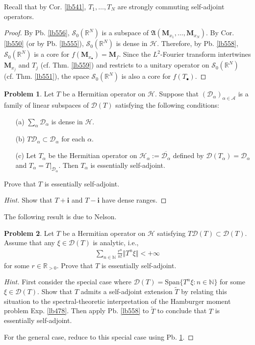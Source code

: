 \documentclass[12pt,b5paper,notitlepage]{article}
\theoremstyle{definition}
\newtheorem{prob}{\color{red}Problem}[section]
\theoremstyle{plain}
\newcommand{\fk}{\mathfrak}
\newcommand{\wtd}{\widetilde}
\newcommand{\ovl}{\overline}
\newcommand{\Dom}{\mathscr{D}}
\newcommand{\Span}{\mathrm{Span}}
\newcommand{\im}{\mathbf{i}}
\newcommand{\blt}{\bullet}
\newcommand{\Nbb}{\mathbb N}
\newcommand{\Rbb}{\mathbb R}
\newcommand{\MH}{\mathcal H}
\newcommand{\MS}{\mathcal S}
\newcommand{\SA}{\mathscr A}
\newcommand{\Mbf}{\mathbf M}
\numberwithin{equation}{section}
\begin{document}
Recall that by Cor. \ref{lb541}, $T_1,\dots,T_N$ are strongly commuting self-adjoint operators.

\begin{proof}
By Pb. \ref{lb556}, $\MS_0(\Rbb^N)$ is a subspace of $\fk A(\Mbf_{x_1},\dots,\Mbf_{x_N})$. By Cor. \ref{lb550} (or by Pb. \ref{lb555}), $\MS_0(\Rbb^N)$ is dense in $\MH$. Therefore, by Pb. \ref{lb558}, $\MS_0(\Rbb^N)$ is a core for $f(\Mbf_{x_\blt})=\Mbf_f$. Since the $L^2$-Fourier transform intertwines $\Mbf_{x_j}$ and $T_j$ (cf. Thm. \ref{lb559}) and restricts to a unitary operator on $\MS_0(\Rbb^N)$ (cf. Thm. \ref{lb551}), the space $\MS_0(\Rbb^N)$ is also a core for $f(T_\blt)$.
\end{proof}


\begin{prob}\label{lb552}
Let $T$ be a Hermitian operator on $\MH$. Suppose that $(\Dom_\alpha)_{\alpha\in\SA}$ is a family of linear subspaces of $\Dom(T)$ satisfying the following conditions:
\begin{enumerate}
\item[(a)] $\sum_\alpha\Dom_\alpha$ is dense in $\MH$.
\item[(b)] $T\Dom_\alpha\subset\Dom_{\alpha}$ for each $\alpha$.
\item[(c)] Let $T_\alpha$ be the Hermitian operator on $\MH_\alpha:=\ovl{\Dom_\alpha}$ defined by $\Dom(T_\alpha)=\Dom_\alpha$ and $T_\alpha=T|_{\Dom_\alpha}$. Then $T_\alpha$ is essentially self-adjoint. 
\end{enumerate}
Prove that $T$ is essentially self-adjoint.
\end{prob}

\begin{proof}[Hint]
Show that $T+\im$ and $T-\im$ have dense ranges.
\end{proof}

The following result is due to Nelson.

\begin{prob}
Let $T$ be a Hermitian operator on $\MH$ satisfying $T\Dom(T)\subset\Dom(T)$. Assume that any $\xi\in\Dom(T)$ is analytic, i.e., 
\begin{align*}
\sum_{n\in\Nbb}\frac{r^n}{n!}\Vert T^n\xi\Vert<+\infty
\end{align*}
for some $r\in\Rbb_{>0}$. Prove that $T$ is essentially self-adjoint.
\end{prob}

\begin{proof}[Hint]
First consider the special case where $\Dom(T)=\Span\{T^n\xi:n\in\Nbb\}$ for some $\xi\in\Dom(T)$. Show that $T$ admits a self-adjoint extension $\wtd T$ by relating this situation to the spectral-theoretic interpretation of the Hamburger moment problem Exp. \ref{lb478}. Then apply Pb. \ref{lb558} to $\wtd T$ to conclude that $T$ is essentially self-adjoint.

For the general case, reduce to this special case using Pb. \ref{lb552}.
\end{proof}
\end{document}
